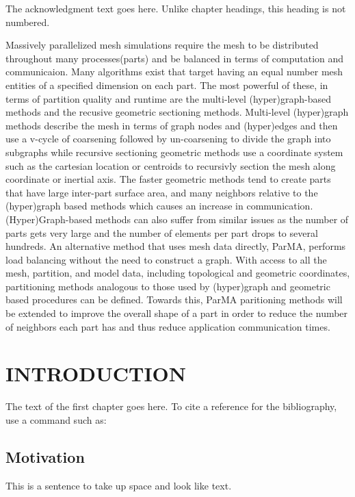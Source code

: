 \documentclass{thesis}
\author{Gerrett Diamond, Cameron Smith}
\begin{document}
 
\titlepage             %
\tableofcontents       %
\listoftables          %
\listoffigures         %

The acknowledgment text goes here. Unlike chapter headings, 
this heading is not numbered.

Massively parallelized mesh simulations require the mesh to be distributed
throughout many processes(parts) and be balanced in terms of computation and
communicaion. 
Many algorithms exist that target having an equal number mesh entities of a
specified dimension on each part. 
The most powerful of these, in terms of partition quality and runtime are the
multi-level (hyper)graph-based methods and the recusive geometric sectioning
methods. 
Multi-level (hyper)graph methods describe the mesh in terms of graph nodes and
(hyper)edges and then use a v-cycle of coarsening followed by un-coarsening to
divide the graph into subgraphs while recursive sectioning geometric methods use
a coordinate system such as the cartesian location or centroids to recursivly
section the mesh along coordinate or inertial axis. 
The faster geometric methods tend to create parts that have large inter-part
surface area, and many neighbors relative to the (hyper)graph based methods
which causes an increase in communication.
(Hyper)Graph-based methods can also suffer from similar issues as the number of
parts gets very large and the number of elements per part drops to several
hundreds. 
An alternative method that uses mesh data directly, ParMA, performs load 
balancing without the need to construct a graph. 
With access to all the mesh, partition, and model data, including topological 
and geometric coordinates, partitioning methods analogous to those used by 
(hyper)graph and geometric based procedures can be defined.
Towards this, ParMA paritioning methods will be extended to improve the overall 
shape of a part in order to reduce the number of neighbors each part has and 
thus reduce application communication times.

\chapter{INTRODUCTION}
The text of the first chapter goes here. To cite a reference for the
bibliography, use a command such as:\cite{thisbook}
\section{Motivation}
This is a sentence to take up space and look like text.
\end{document}
